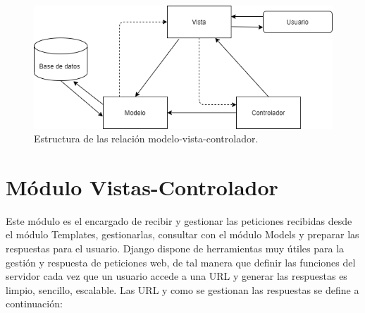 \documentclass[a4paper, 12pt]{book}
\begin{document}
\begin{figure}
	\centering
	\includegraphics[width=12cm, keepaspectratio]{img/model-vista-controlador.png}
	\caption{Estructura de las relación modelo-vista-controlador.}\label{fig:arquitectura}
\end{figure}

\section{Módulo Vistas-Controlador}
Este módulo es el encargado de recibir y gestionar las peticiones recibidas desde el módulo Templates, gestionarlas, consultar con el módulo Models y preparar las respuestas para el usuario. Django dispone de herramientas muy útiles para la gestión y respuesta de peticiones web, de tal manera que definir las funciones del servidor cada vez que un usuario accede a una URL y generar las respuestas es limpio, sencillo, escalable. 
Las URL y como se gestionan las respuestas se define a continuación: 
\end{document}
